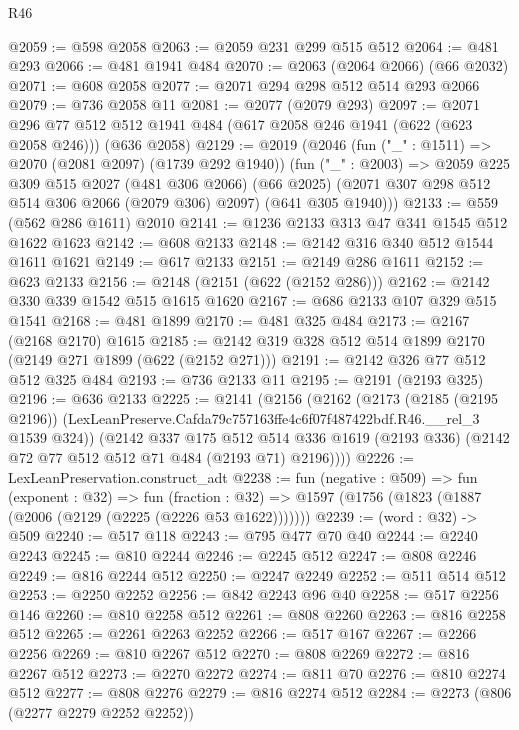\begin{lexlean}{R46}
\begin{coremodule}
@2059 := @598 @2058
@2063 := @2059 @231 @299 @515 @512
@2064 := @481 @293
@2066 := @481 @1941 @484
@2070 := @2063 (@2064 @2066) (@66 @2032)
@2071 := @608 @2058
@2077 := @2071 @294 @298 @512 @514 @293 @2066
@2079 := @736 @2058 @11
@2081 := @2077 (@2079 @293)
@2097 := @2071
    @296
    @77
    @512
    @512
    @1941
    @484
    (@617 @2058 @246 @1941 (@622 (@623 @2058 @246)))
    (@636 @2058)
@2129 := @2019
    (@2046
      (fun ("_" : @1511) => @2070 (@2081 @2097) (@1739 @292 @1940))
      (fun ("_" : @2003) =>
      @2059
        @225
        @309
        @515
        @2027
        (@481 @306 @2066)
        (@66 @2025)
        (@2071 @307 @298 @512 @514 @306 @2066 (@2079 @306) @2097)
        (@641 @305 @1940)))
@2133 := @559 (@562 @286 @1611) @2010
@2141 := @1236 @2133 @313 @47 @341 @1545 @512 @1622 @1623
@2142 := @608 @2133
@2148 := @2142 @316 @340 @512 @1544 @1611 @1621
@2149 := @617 @2133
@2151 := @2149 @286 @1611
@2152 := @623 @2133
@2156 := @2148 (@2151 (@622 (@2152 @286)))
@2162 := @2142 @330 @339 @1542 @515 @1615 @1620
@2167 := @686 @2133 @107 @329 @515 @1541
@2168 := @481 @1899
@2170 := @481 @325 @484
@2173 := @2167 (@2168 @2170) @1615
@2185 := @2142 @319 @328 @512 @514 @1899 @2170 (@2149 @271 @1899 (@622 (@2152 @271)))
@2191 := @2142 @326 @77 @512 @512 @325 @484
@2193 := @736 @2133 @11
@2195 := @2191 (@2193 @325)
@2196 := @636 @2133
@2225 := @2141
    (@2156
      (@2162
        (@2173
          (@2185 (@2195 @2196))
          (LexLeanPreserve.Cafda79c757163ffe4c6f07f487422bdf.R46.__rel_3 @1539 @324))
        (@2142
          @337
          @175
          @512
          @514
          @336
          @1619
          (@2193 @336)
          (@2142 @72 @77 @512 @512 @71 @484 (@2193 @71) @2196))))
@2226 := LexLeanPreservation.construct_adt
@2238 := fun (negative : @509) =>
  fun (exponent : @32) =>
  fun (fraction : @32) => @1597 (@1756 (@1823 (@1887 (@2006 (@2129 (@2225 (@2226 @53 @1622)))))))
@2239 := (word : @32) -> @509
@2240 := @517 @118
@2243 := @795 @477 @70 @40
@2244 := @2240 @2243
@2245 := @810 @2244
@2246 := @2245 @512
@2247 := @808 @2246
@2249 := @816 @2244 @512
@2250 := @2247 @2249
@2252 := @511 @514 @512
@2253 := @2250 @2252
@2256 := @842 @2243 @96 @40
@2258 := @517 @2256 @146
@2260 := @810 @2258 @512
@2261 := @808 @2260
@2263 := @816 @2258 @512
@2265 := @2261 @2263 @2252
@2266 := @517 @167
@2267 := @2266 @2256
@2269 := @810 @2267 @512
@2270 := @808 @2269
@2272 := @816 @2267 @512
@2273 := @2270 @2272
@2274 := @811 @70
@2276 := @810 @2274 @512
@2277 := @808 @2276
@2279 := @816 @2274 @512
@2284 := @2273 (@806 (@2277 @2279 @2252 @2252))

\end{coremodule}
\end{lexlean}
